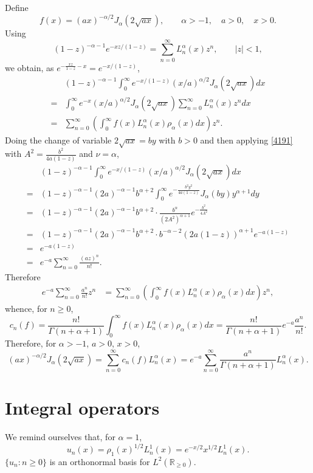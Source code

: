 \documentclass{article}
\theoremstyle{definition}
\begin{document}
Define
\[
f(x)=(ax)^{-\alpha/2} J_\alpha(2\sqrt{ax}),\qquad \alpha>-1,\quad a>0,\quad x>0.
\]
Using 
\[
(1-z)^{-\alpha-1} e^{-xz/(1-z)} = \sum_{n=0}^\infty L_n^\alpha(x) z^n,\qquad
|z|<1,
\]
we obtain, as $e^{-\frac{xz}{1-z}-x}= e^{-x/(1-z)}$,
\[
\begin{split}
&(1-z)^{-\alpha-1} \int_0^\infty e^{-x/(1-z)} (x/a)^{\alpha/2} J_\alpha(2\sqrt{ax}) dx\\
=&\int_0^\infty e^{-x} (x/a)^{\alpha/2} J_\alpha(2\sqrt{ax}) \sum_{n=0}^\infty L_n^\alpha(x) z^n dx\\
=&\sum_{n=0}^\infty \left(\int_0^\infty f(x) L_n^\alpha(x) \rho_\alpha(x) dx\right) z^n.
\end{split}
\]
Doing the change of variable $2\sqrt{ax}=by$ with $b>0$ and then applying \eqref{4191} with
$A^2=\frac{b^2}{4a(1-z)}$ and $\nu=\alpha$,
\[
\begin{split}
&(1-z)^{-\alpha-1} \int_0^\infty e^{-x/(1-z)} (x/a)^{\alpha/2} J_\alpha(2\sqrt{ax}) dx\\
=&(1-z)^{-\alpha-1} (2a)^{-\alpha-1} b^{\alpha+2} \int_0^\infty e^{-\frac{b^2 y^2}{4a(1-z)}} 
J_\alpha(by) y^{\alpha+1} dy\\
=&(1-z)^{-\alpha-1} (2a)^{-\alpha-1} b^{\alpha+2} \cdot \frac{b^\alpha}{(2A^2)^{\alpha+1}} e^{-\frac{b^2}{4A^2}}\\
=&(1-z)^{-\alpha-1} (2a)^{-\alpha-1} b^{\alpha+2} \cdot b^{-\alpha-2} (2a(1-z))^{\alpha+1} e^{-a(1-z)}\\
=& e^{-a(1-z)}\\
=&e^{-a} \sum_{n=0}^\infty \frac{(az)^n}{n!}.
\end{split}
\]
Therefore
\begin{align*}
e^{-a} \sum_{n=0}^\infty \frac{a^n}{n!} z^n&=\sum_{n=0}^\infty \left(\int_0^\infty f(x) L_n^\alpha(x) \rho_\alpha(x) dx\right) z^n,
\end{align*}
whence, for $n \geq 0$,
\[
c_n(f) = \frac{n!}{\Gamma(n+\alpha+1)} \int_0^\infty f(x) L_n^\alpha(x) \rho_\alpha(x) dx
=\frac{n!}{\Gamma(n+\alpha+1)} e^{-a} \frac{a^n}{n!}.
\]
Therefore, for $\alpha>-1$, $a>0$, $x>0$,
\[
(ax)^{-\alpha/2} J_\alpha(2\sqrt{ax}) = \sum_{n=0}^\infty c_n(f) L_n^\alpha(x)
=e^{-a} \sum_{n=0}^\infty \frac{a^n}{\Gamma(n+\alpha+1)} L_n^\alpha(x).
\]



\section{Integral operators}
We remind ourselves that, for $\alpha=1$,
\[
u_n(x)=\rho_1(x)^{1/2} L_n^1(x) = e^{-x/2} x^{1/2} L_n^1(x).
\]
$\{u_n: n \geq 0\}$ is an orthonormal basis for $L^2(\mathbb{R}_{\geq 0})$.
\end{document}
